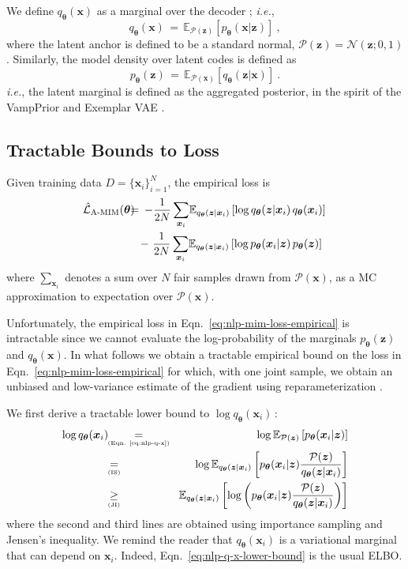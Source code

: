 \documentclass{article}
\newcommand{\bs}{\boldsymbol}
\newcommand{\ie}{{\em i.e.}}
\newcommand{\x}{{\bs{x}}}
\newcommand{\z}{{\bs z}}
\newcommand{\params}{{\bs \theta}}
\newcommand{\pjoint}{\mathcal{P}}
\newcommand{\pdec}{p}
\newcommand{\penc}{q}
\newcommand{\Mdec}{\pdec_{\params}}
\newcommand{\Menc}{\penc_{\params}}
\newcommand{\EAMIMloss}{\hat{\mathcal{L}}_\text{A-MIM}}
\newcommand{\E}[2]{\mathbb{E}_{#1}\left[#2\right]}
\begin{document}
We define $\Menc(\x)$ as a marginal over the decoder \cite{DBLP:journals/corr/BornscheinSFB15}; \ie,
\begin{equation}
     \Menc(\x) \, = \, \E{\pjoint(\z)}{\Mdec(\x|\z)}  ~,
    \label{eq:nlp-q-x}
\end{equation}
where the latent anchor is defined to be a standard normal, $\pjoint(\z) = \mathcal{N}(\z ; 0, 1)$.
Similarly, the model density over latent codes is defined as
\begin{equation}
    \Mdec(\z) \,=\,  \E{\pjoint(\x)}{\Menc(\z|\x)}~.
    \label{eq:nlp-p-z}
\end{equation}
\ie, the latent marginal is defined as the aggregated posterior, in the spirit of the 
VampPrior \cite{DBLP:journals/corr/TomczakW17} and Exemplar VAE \cite{ExemplarVAE2020}.




\subsection{Tractable Bounds to Loss}

Given training data $D = \{\x_i \}_{i=1}^N$, the empirical loss is
\begin{eqnarray}
    \!\EAMIMloss (\params) \!\!\!\!
    &=& \!\!\!
    - \frac{1}{2N}
    \sum_{\x_i}\! \E{\Menc(\z|\x_i)}{\log  \Menc(\z|\x_i)\,\Menc(\x_i)} \nonumber \\
    && \hspace*{-0.65cm}
    - ~ \frac{1}{2N}
    \sum_{\x_i}\! \E{\Menc(\z|\x_i)}{\log \Mdec(\x_i|\z)\,\Mdec(\z)} ~
    \label{eq:nlp-mim-loss-empirical}
\end{eqnarray}
where $\sum_{\x_i}$ denotes a sum over $N$ fair samples drawn from $\pjoint(\x)$, 
as a MC approximation to expectation over $\pjoint(\x)$.

Unfortunately, the empirical loss in Eqn.\ \eqref{eq:nlp-mim-loss-empirical} is intractable since we
cannot evaluate the log-probability of the marginals $\Mdec(\z)$ and $\Menc(\x)$.
In what follows we obtain a tractable empirical bound on the loss in Eqn.\ \eqref{eq:nlp-mim-loss-empirical}
for which, with one joint sample, we obtain an unbiased and low-variance estimate of the gradient using reparameterization \cite{Kingma2013}.

We first derive a tractable lower bound to $\log \Menc(\x_i)\, $:
\begin{eqnarray}
    \log \Menc(\x_i)\!\! &\underset{\text{\tiny (Eqn. \ref{eq:nlp-q-x})}}{=}& \!\log \E{\pjoint(\z)}{\Mdec(\x_i|\z)}  \label{eq:nlp-q-x-lower-bound} \\
    &\underset{\text{\tiny (IS)}}{=}& \!\log \E{\Menc(\z|\x_i)}{\Mdec(\x_i|\z)\frac{\pjoint(\z)}{\Menc(\z|\x_i)}}
     \nonumber \\
    &\underset{\text{\tiny (JI)}}{\ge}& \!\E{\Menc(\z|\x_i)}{\log \left(  \Mdec(\x_i|\z)\frac{\pjoint(\z)}{\Menc(\z|\x_i)} \right) }  \nonumber
\end{eqnarray}
where the second and third lines are obtained using importance sampling and Jensen's inequality.
We remind the reader that $\Menc(\x_i)$ is a variational marginal that can depend
on $\x_i$.  Indeed, Eqn.\ \eqref{eq:nlp-q-x-lower-bound} is the usual ELBO.
\end{document}
